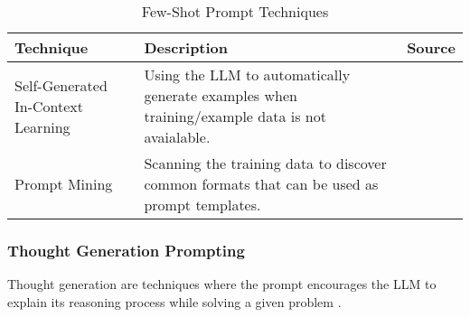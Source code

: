 \begin{table}[h!]
    \centering
    \begin{tabular}{p{3cm} p{8cm} p{2cm}}
        \toprule
        \textbf{Technique} & \textbf{Description} & \textbf{Source} \\
        \midrule
        \raggedright
        Self-Generated In-Context Learning & Using the LLM to automatically generate examples when training/example data is not avaialable. & \textcite{self-generating} \\
        \hline
        \raggedright
        Prompt Mining & Scanning the training data to discover common formats that can be used as prompt templates. & \textcite{mining} \\
        \bottomrule
    \end{tabular}
    \caption{Few-Shot Prompt Techniques}
    \label{tab:few_shot}
\end{table}

\FloatBarrier

\subsubsection{Thought Generation Prompting}

Thought generation are techniques where the prompt encourages the LLM to explain its reasoning process while solving a given problem \parencite{prompt1}.

